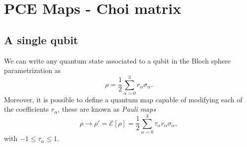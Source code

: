 \section{PCE Maps - Choi matrix} %
% 
\subsection{A single qubit} %

We can write any quantum state associated to a qubit in the Bloch sphere parametrization as
% 
\begin{equation}
\rho=\frac{1}{2}\sum_{\alpha=0}^{3} r_{\alpha} \sigma_{\alpha}.
\label{rho2}
\end{equation}
% 
Moreover, it is possible to define a quantum map capable of modifying each of the coefficients $r_{\alpha}$, these are known as \textit{Pauli maps}
% 
\begin{equation}
\rho \to \rho'=\mathcal{E}[\rho ]=\frac{1}{2}\sum_{\alpha=0}^{3} \tau_{\alpha} r_{\alpha} \sigma_{\alpha},
\label{Pauli_Map}
\end{equation}
% 
with $-1\leq \tau_{\alpha} \leq 1$. 

